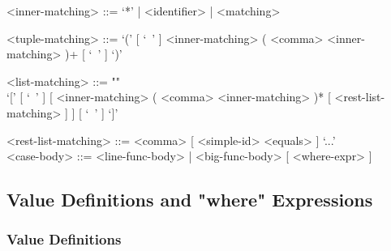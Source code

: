 \documentclass{article}
\begin{document}
\begin{itemize}
\begin{grammar}
<inner-matching> ::= `*' | <identifier> | <matching>

<tuple-matching> ::=
`(' [ `\ ' ] <inner-matching> ( <comma> <inner-matching> )+ [ `\ ' ] `)'

<list-matching> ::= ""\\
`[' [ `\ ' ]
[ <inner-matching> ( <comma> <inner-matching> )* [ <rest-list-matching> ] ]
[ `\ ' ] `]'

<rest-list-matching> ::= <comma> [ <simple-id> <equals> ] `...'
\\

<case-body> ::= <line-func-body> | <big-func-body> [ <where-expr> ]
\end{grammar}

\end{itemize}

\newpage

\subsection{Value Definitions and "where" Expressions}
\label{subsec:valdefswhere}

\subsubsection{Value Definitions}
\label{subsubsec:valdefs}
\end{document}
